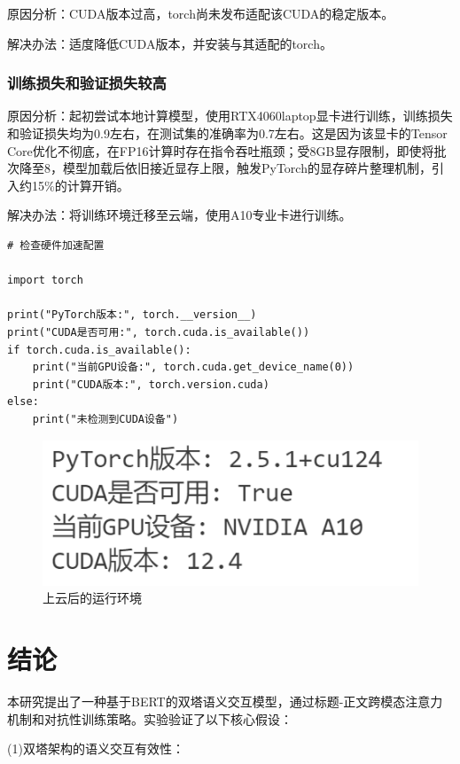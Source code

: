 \documentclass{cjc}
\begin{document}
原因分析：CUDA版本过高，torch尚未发布适配该CUDA的稳定版本。

解决办法：适度降低CUDA版本，并安装与其适配的torch。

\subsubsection{训练损失和验证损失较高}

原因分析：起初尝试本地计算模型，使用RTX4060laptop显卡进行训练，训练损失和验证损失均为0.9左右，在测试集的准确率为0.7左右。这是因为该显卡的Tensor Core优化不彻底，在FP16计算时存在指令吞吐瓶颈；受8GB显存限制，即使将批次降至8，模型加载后依旧接近显存上限，触发PyTorch的显存碎片整理机制，引入约15\%的计算开销。

解决办法：将训练环境迁移至云端，使用A10专业卡进行训练。

\begin{verbatim}
# 检查硬件加速配置

import torch

print("PyTorch版本:", torch.__version__)
print("CUDA是否可用:", torch.cuda.is_available())
if torch.cuda.is_available():
    print("当前GPU设备:", torch.cuda.get_device_name(0))
    print("CUDA版本:", torch.version.cuda)
else:
    print("未检测到CUDA设备")
\end{verbatim}

\begin{figure}[htb]
  \centering
  \includegraphics[width=\linewidth]{train_env.png}
  \caption{上云后的运行环境}
\end{figure}

\section{结论}

本研究提出了一种基于BERT的双塔语义交互模型，通过标题-正文跨模态注意力机制和对抗性训练策略。实验验证了以下核心假设：

(1)双塔架构的语义交互有效性：
\end{document}
